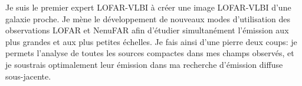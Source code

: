 %
%	

\begin{tcolorbox}[colback=green!10, colframe=green!50!black, arc=3mm, boxrule=1pt]
Je suis le premier expert LOFAR-VLBI \`a cr\'eer une image LOFAR-VLBI d'une galaxie proche. Je m\`ene le d\'eveloppement de nouveaux modes d'utilisation des observations LOFAR et NenuFAR afin d'\'etudier simultan\'ement l'\'emission aux plus grandes et aux plus petites \'echelles. Je fais ainsi d'une pierre deux coups: je permets l'analyse de toutes les sources compactes dans mes champs observ\'es, et je soustrais optimalement leur \'emission dans ma recherche d'\'emission diffuse sous-jacente.
\end{tcolorbox}



\setlength{\bibsep}{0pt plus 0.3ex}
\begin{multicols}{3}
	\small%
	{
		
		
	}
\end{multicols}

%
%
%

